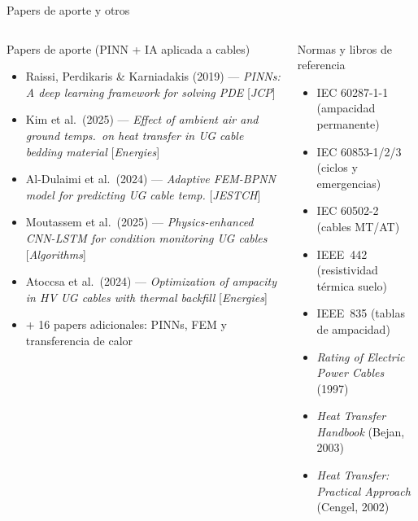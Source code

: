 \documentclass[aspectratio=169]{beamer}
\begin{document}
\begin{frame}{Papers de aporte y otros}
  \begin{columns}[T]
      \begin{block}{\small Papers de aporte (PINN + IA aplicada a cables)}
        \tiny
        \begin{itemize}
          \item Raissi, Perdikaris \& Karniadakis (2019) ---
                \textit{PINNs: A deep learning framework for solving PDE}
                [\textit{JCP}]
          \item Kim et al.\ (2025) ---
                \textit{Effect of ambient air and ground temps.\ on heat
                transfer in UG cable bedding material}
                [\textit{Energies}]
          \item Al-Dulaimi et al.\ (2024) ---
                \textit{Adaptive FEM-BPNN model for predicting UG cable temp.}
                [\textit{JESTCH}]
          \item Moutassem et al.\ (2025) ---
                \textit{Physics-enhanced CNN-LSTM for condition monitoring
                UG cables} [\textit{Algorithms}]
          \item Atoccsa et al.\ (2024) ---
                \textit{Optimization of ampacity in HV UG cables with
                thermal backfill} [\textit{Energies}]
          \item + 16 papers adicionales: PINNs, FEM y transferencia de calor
        \end{itemize}
      \end{block}
      \begin{exampleblock}{\small Normas y libros de referencia}
        \tiny
        \begin{itemize}
          \item IEC 60287-1-1 (ampacidad permanente)
          \item IEC 60853-1/2/3 (ciclos y emergencias)
          \item IEC 60502-2 (cables MT/AT)
          \item IEEE~442 (resistividad térmica suelo)
          \item IEEE~835 (tablas de ampacidad)
          \item \textit{Rating of Electric Power Cables} (1997)
          \item \textit{Heat Transfer Handbook} (Bejan, 2003)
          \item \textit{Heat Transfer: Practical Approach} (Cengel, 2002)

\end{itemize}
\end{exampleblock}
\end{columns}
\end{frame}
\end{document}
